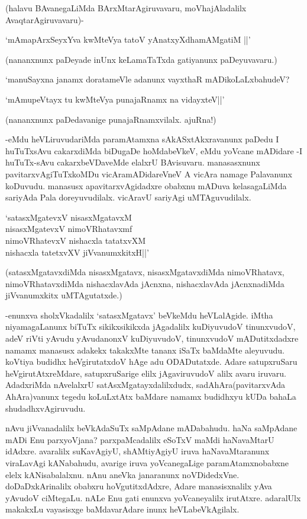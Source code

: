 (halavu BAvanegaLiMda BArxMtarAgiruvavaru, moVhajAladalilx Avaqta\-rAgiruvavaru)-

\begin{shloka}
`mAmapArxSeyxYva kwMteVya tatoV yAnatxyXdhamAMgatiM ||'
\end{shloka}

(nananxnunx paDeyade inUnx keLamaTaTxda gatiyanunx paDeyuvavaru.)

`manuSayxna janamx doratameVle adanunx vayxthaR mADikoLaLxbahudeV?

\begin{shloka}
`mAmupeVtayx tu kwMteVya punajaRnamx na vidayxteV||'
\end{shloka}

(nananxnunx paDedavanige punajaRnamxvilalx. ajuRna!)

-eMdu heVLiruvudariMda paramAtamxna sAkASxtAkxravanunx paDedu I huTuTxsAvu cakarxdiMda biDugaDe hoMdabeVkeV, eMdu yoVcane mADidare -I huTuTx-sAvu cakarxbeVDaveMde elalxrU BAvisuvaru. manasasxnunx pavitarxvAgiTuTxkoMDu vicAramADidareVneV A vicAra namage Palavanunx koDuvudu. manasusx apavitarxvAgidadxre obabxnu mADuva kelasagaLiMda sariyAda Pala doreyuvudilalx. vicAravU sariyAgi uMTAguvudilalx.

\begin{shloka}
`satasxMgatevxV nisasxMgatavxM\\
nisasxMgatevxV nimoVRhatavxmf\\
nimoVRhatevxV nishacxla tatatxvXM\\
nishacxla tatetxvXV jiVvanumxkitxH||'
\end{shloka}

(satasxMgatavxdiMda nisasxMgatavx, nisasxMgatavxdiMda nimoVRhatavx, nimoVRhatavxdiMda nishacxlavAda jAcnxna, nishacxlavAda jAcnxnadiMda jiVvanumxkitx uMTAgutatxde.)

-enunxva sholxVkadalilx `satasxMgatavx' beVkeMdu heVLalAgide. iMtha niyamagaLanunx biTuTx  sikikxsikikxda jAgadalilx kuDiyuvudoV tinunxvudoV, adeV riVti yAvudu yAvudanonxV kuDiyuvudoV, tinunxvudoV mADutitxdadxre namamx manasusx adakekx takakxMte tananx iSaTx baMdaMte aleyuvudu. koVtiya budidhx heVgirutatxdoV hAge adu ODADutatxde. Adare satupxruSaru heVgirutAtxreMdare, satupxruSarige elilx jAgaviruvudoV alilx avaru iruvaru. AdadxriMda nAvelalxrU satAsxMgatayxdalilxdudx, sadAhAra(pavitarxvAda AhAra)vanunx tegedu koLuLxtAtx baMdare namamx budidhxyu kUDa bahaLa shudadhxvAgiruvudu.

nAvu jiVvanadalilx beVkAdaSuTx saMpAdane mADabahudu. haNa saMpAdane mADi Enu parxyoVjana? parxpaMcadalilx eSoTxV maMdi haNavaMtarU idAdxre. avaralilx suKavAgiyU, shAMtiyAgiyU iruva haNavaMtaranunx viraLavAgi kANabahudu, avarige iruva yoVcanegaLige paramAtamxnobabxne elelx kANisabalalxnu. nAnu aneVka janaranunx noVDidedxVne. doDaDxkArinalilx obabxru hoVgutitxdAdxre, Adare manasisxnalilx yAva yAvudoV ciMtegaLu. nALe Enu gati enunxva yoVcaneyalilx irutAtxre. adaralUlx makakxLu vayasisxge baMdavarAdare inunx heVLabeVkAgilalx.

